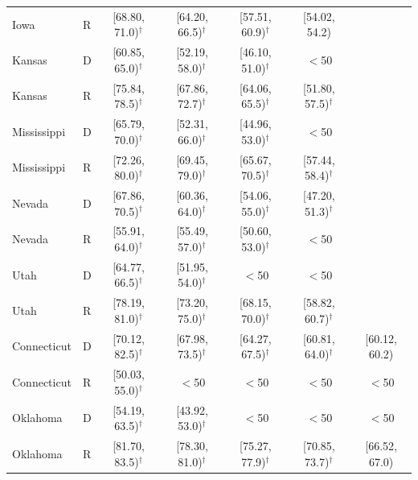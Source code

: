\begin{longtable}{llccccc}
Iowa & R & [68.80, 71.0)$^\dagger$ & [64.20, 66.5)$^\dagger$ & [57.51, 60.9)$^\dagger$ & [54.02, 54.2) &  \\
Kansas & D & [60.85, 65.0)$^\dagger$ & [52.19, 58.0)$^\dagger$ & [46.10, 51.0)$^\dagger$ & $<$50 &  \\
Kansas & R & [75.84, 78.5)$^\dagger$ & [67.86, 72.7)$^\dagger$ & [64.06, 65.5)$^\dagger$ & [51.80, 57.5)$^\dagger$ &  \\
Mississippi & D & [65.79, 70.0)$^\dagger$ & [52.31, 66.0)$^\dagger$ & [44.96, 53.0)$^\dagger$ & $<$50 &  \\
Mississippi & R & [72.26, 80.0)$^\dagger$ & [69.45, 79.0)$^\dagger$ & [65.67, 70.5)$^\dagger$ & [57.44, 58.4)$^\dagger$ &  \\
Nevada & D & [67.86, 70.5)$^\dagger$ & [60.36, 64.0)$^\dagger$ & [54.06, 55.0)$^\dagger$ & [47.20, 51.3)$^\dagger$ &  \\
Nevada & R & [55.91, 64.0)$^\dagger$ & [55.49, 57.0)$^\dagger$ & [50.60, 53.0)$^\dagger$ & $<$50 &  \\
Utah & D & [64.77, 66.5)$^\dagger$ & [51.95, 54.0)$^\dagger$ & $<$50 & $<$50 &  \\
Utah & R & [78.19, 81.0)$^\dagger$ & [73.20, 75.0)$^\dagger$ & [68.15, 70.0)$^\dagger$ & [58.82, 60.7)$^\dagger$ &  \\
Connecticut & D & [70.12, 82.5)$^\dagger$ & [67.98, 73.5)$^\dagger$ & [64.27, 67.5)$^\dagger$ & [60.81, 64.0)$^\dagger$ & [60.12, 60.2) \\
Connecticut & R & [50.03, 55.0)$^\dagger$ & $<$50 & $<$50 & $<$50 & $<$50 \\
Oklahoma & D & [54.19, 63.5)$^\dagger$ & [43.92, 53.0)$^\dagger$ & $<$50 & $<$50 & $<$50 \\
Oklahoma & R & [81.70, 83.5)$^\dagger$ & [78.30, 81.0)$^\dagger$ & [75.27, 77.9)$^\dagger$ & [70.85, 73.7)$^\dagger$ & [66.52, 67.0) \\
\bottomrule
\end{longtable}
